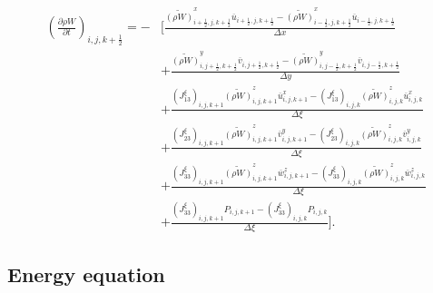 \begin{align}
 \left(\frac{\partial \rho W}{\partial t}\right)_{i,j,k+\frac{1}{2}}
 = - &\Bigg[ \frac{ \widetilde{(\rho W)}^x_{i+\frac{1}{2},j,k+\frac{1}{2}} \overline{u}_{i+\frac{1}{2},j,k+\frac{1}{2}}
                  - \widetilde{(\rho W)}^x_{i-\frac{1}{2},j,k+\frac{1}{2}} \overline{u}_{i-\frac{1}{2},j,k+\frac{1}{2}}
                  } {\Delta x} \nonumber \\
          &+ \frac{ \widetilde{(\rho W)}^y_{i,j+\frac{1}{2},k+\frac{1}{2}} \overline{v}_{i,j+\frac{1}{2},k+\frac{1}{2}}
                  - \widetilde{(\rho W)}^y_{i,j-\frac{1}{2},k+\frac{1}{2}} \overline{v}_{i,j-\frac{1}{2},k+\frac{1}{2}}
                  } {\Delta y} \nonumber \\
          &+ \frac{ (J^{\xi}_{13})_{i,j,k+1} \widetilde{(\rho W)}^z_{i,j,k+1} \overline{u}^x_{i,j,k+1}
                  - (J^{\xi}_{13})_{i,j,k  } \widetilde{(\rho W)}^z_{i,j,k  } \overline{u}^x_{i,j,k  }
                  } {\Delta \xi} \nonumber \\
          &+ \frac{ (J^{\xi}_{23})_{i,j,k+1} \widetilde{(\rho W)}^z_{i,j,k+1} \overline{v}^y_{i,j,k+1}
                  - (J^{\xi}_{23})_{i,j,k  } \widetilde{(\rho W)}^z_{i,j,k  } \overline{v}^y_{i,j,k  }
                  } {\Delta \xi} \nonumber \\
          &+ \frac{ (J^{\xi}_{33})_{i,j,k+1} \widetilde{(\rho W)}^z_{i,j,k+1} \overline{w}^z_{i,j,k+1}
                  - (J^{\xi}_{33})_{i,j,k  } \widetilde{(\rho W)}^z_{i,j,k  } \overline{w}^z_{i,j,k  }
                  } {\Delta \xi} \nonumber \\
          &+ \frac{ (J^{\xi}_{33})_{i,j,k+1} P_{i,j,k+1}
                  - (J^{\xi}_{33})_{i,j,k  } P_{i,j,k  }
                  } {\Delta \xi} \Bigg].
\end{align}

\subsection{Energy equation}

